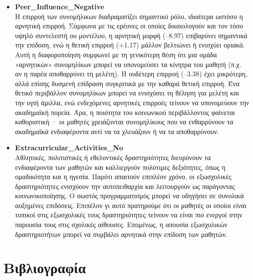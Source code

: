 \documentclass[12pt]{article}
\begin{document}
\begin{itemize}
\item \textbf{Peer\_{Influence}\_{Negative}}\\
Η επιρροή των συνομήλικων διαδραματίζει σημαντικό ρόλο, ιδιαίτερα ωστόσο η αρνητική επιρροή. Σύμφωνα με τις ερέυνες οι οποίες δικαιολογούν και τον τόσο υψηλό συντελεστή ου μοντέλου, η αρνητική μορφή (–8.97) 
επιβαρύνει σημαντικά την επίδοση, ενώ η θετική επιρροή (+1.17) μάλλον βελτιώνει ή ενισχύει οριακά. Αυτή η διαφοροποίηση συμφωνεί με τη γενικότερη θέση ότι μια ομάδα «αρνητικών» συνομηλίκων μπορεί να υπονομεύσει
τα κίνητρα του μαθητή (π.χ. αν η παρέα αποθαρρύνει τη μελέτη). Η ουδέτερη επιρροή (–3.38) έχει μικρότερη, αλλά επίσης δυσμενή επίδραση συγκριτικά με την καθαρά θετική επιρροή. Ένα θετικό περιβάλλον συνομηλίκων 
μπορεί να ενισχύσει τη θέληση για μελέτη και την υγιή άμιλλα, ενώ ενδεχόμενες αρνητικές επιρροές τείνουν να υπονομεύουν την ακαδημαϊκή πορεία. Άρα, η ποιότητα του κοινωνικού περιβάλλοντος φαίνεται καθοριστική
· οι μαθητές χρειάζονται συνομηλίκους που να ενθαρρύνουν τα ακαδημαϊκά ενδιαφέροντα αντί να τα χλευάζουν ή να τα αποθαρρύνουν.
\item \textbf{Extracurricular\_{Activities}\_{No}}\\  
Αθλητικές, πολιτιστικές ή εθελοντικές δραστηριότητες διευρύνουν τα ενδιαφέροντα των μαθητών και καλλιεργούν πολύτιμες δεξιότητες, όπως η ομαδικότητα και η ηγεσία. Παρότι απαιτούν επιπλέον χρόνο, οι εξωσχολικές 
δραστηριότητες ενισχύουν την αυτοπειθαρχία και λειτουργούν ως παράγοντας κοινωνικοποίησης. Ο σωστός προγραμματισμός μπορεί να οδηγήσει σε συνολικά αυξημένες επιδόσεις. Επιπέλον γι αυτό πρατηρούμε ότι οι μαθητές οι οποίοι 
είναι τυπικοί στις εξωσχολικές τους δραστηριότητες τείνουν να είναι πιο ενεργοί στην παρουσία τους στις σχολικές αίθουσες. Επομένως, η απουσία εξωσχολικών δραστηριοτήτων μπορεί να συμβάλει αρνητικά στην επίδοση των μαθητών.

\end{itemize}

\newpage
\section{Βιβλιογραφία}
\end{document}
